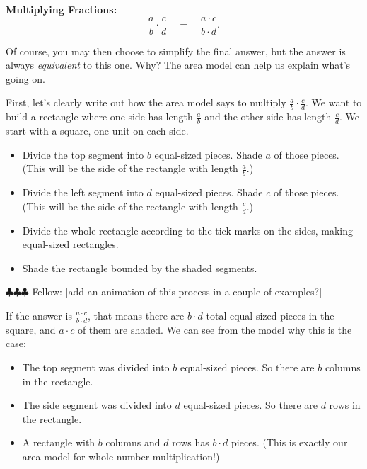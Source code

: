 \documentclass[10pt, reqno]{amsart}
\theoremstyle{remark}
\theoremstyle{definition}
\numberwithin{equation}{section}  %
\newcommand{\fellow}[1]{{\color{magenta} \sf $\clubsuit\clubsuit\clubsuit$ Fellow: [#1]}}
\begin{document}
{\bf Multiplying Fractions:}
\[
\frac a b \cdot \frac cd 
\quad
=
\quad
 \frac{a\cdot c}{b\cdot d}.
\]

Of course, you may then choose to simplify the final answer, but the answer is always \emph{equivalent} to this one.  Why?  The area model can help us explain what's going on.  

First, let's clearly write out how the area model says to multiply $\frac ab \cdot \frac cd$.  We want to build a rectangle where one side has length $\frac a b$ and the other side has length $\frac c d$.  We start with a square, one unit on each side.
\begin{itemize}
\item
Divide the top segment into $b$ equal-sized pieces.  Shade $a$ of those pieces.  (This will be the side of the rectangle with length $\frac a b$.)\\

\item
Divide the left segment into $d$ equal-sized pieces.  Shade $c$ of those pieces.  (This will be the side of the rectangle with length $\frac c d$.)\\

\item
Divide the whole rectangle according to the tick marks on the sides, making equal-sized rectangles.\\

\item
Shade the rectangle bounded by the shaded segments.\\

\end{itemize}

\fellow{add an animation of this process in a couple of examples?}


If the answer is $\frac{a\cdot c}{b\cdot d}$, that means there are $b\cdot d$ total equal-sized pieces in the square, and $a\cdot c$ of them are shaded.  We can see from the model why this is the case:

\begin{itemize}
\item
The top segment was divided into $b$ equal-sized pieces.  So there are $b$ columns in the rectangle.\\

\item
The side segment was divided into $d$ equal-sized pieces.  So there are $d$ rows in the rectangle.\\

\item
A rectangle with $b$ columns and $d$ rows has $b\cdot d$ pieces.  (This is exactly our area model for whole-number multiplication!)\\
\end{itemize}
\end{document}
